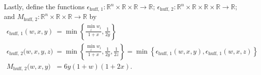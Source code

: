 \documentclass{article}
\newtheorem{lemma}[theorem]{Lemma}
\theoremstyle{case}
\numberwithin{theorem}{subsection}
\newcommand{\ehuffo}{{\epsilon_{\textrm{huff, 1}}}}
\newcommand{\ehufft}{{\epsilon_{\textrm{huff, 2}}}}
\newcommand{\mhufft}{{M_{\textrm{huff, 2}}}}
\newcommand{\bpr}{{B_{\infty}\left(p, r\right)}}
\newcommand{\reals}{\mathbb R}
\newcommand{\Rm}{\mathbb R^m}
\newcommand{\Rn}{\mathbb R^n}
\begin{document}
Lastly, define the functions
$\ehuffo : \Rn \times \reals \times \reals \to \reals$;
$\ehufft : \Rn \times \reals \times \reals \times \reals \to \reals$; and 
$\mhufft : \Rn \times \reals \times \reals \to \reals$
by
\begin{align}
\ehuffo\left(w, x, y\right) &= \min\left\{\frac{\min_i w_i}{1 + x}, \frac 1 {2y}\right\} \label{define_ehuffo} \\
\ehufft\big(w, x, y, z\big) &= \min\left\{\frac{\min_i w_i}{1 + x}, \frac 1 {2y}, \frac 1 {2z}\right\} = \min\left\{\ehuffo\left(w, x, y\right), \ehuffo\left(w, x, z\right) \right\} \label{define_ehufft} \\
\mhufft \big(w, x, y \big) &= 6y \left(1 + w\right) \left(1 + 2 x\right). \label{define_mhufft}
\end{align}






% 

% 
\end{document}
